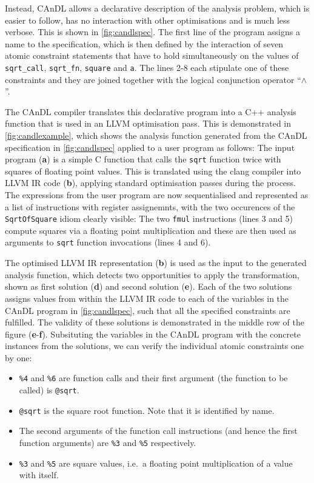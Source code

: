     Instead, CAnDL allows a declarative description of the analysis problem,
    which is easier to follow, has no interaction with other optimisations and
    is much less verbose.
    This is shown in \autoref{fig:candlspec}.
    The first line of the program assigns a name to the specification, which is
    then defined by the interaction of seven atomic constraint statements that
    have to hold simultaneously on the values of \texttt{sqrt\_call},
    \texttt{sqrt\_fn}, \texttt{square} and \texttt{a}.
    The lines 2-8 each stipulate one of these constraints and they are joined
    together with the logical conjunction operator ``$\land$''.

    The CAnDL compiler translates this declarative program into a C++ analysis
    function that is used in an LLVM optimisation pass.
    This is demonstrated in \autoref{fig:candlexample}, which shows the analysis
    function generated from the CAnDL specification in \autoref{fig:candlspec}
    applied to a user program as follows:
    The input program ({\bf a}) is a simple C function that calls the
    \texttt{sqrt} function twice with squares of floating point values.
    This is translated using the clang compiler into LLVM IR code ({\bf b}),
    applying standard optimisation passes during the process.
    The expressions from the user program are now sequentialised and represented
    as a list of instructions with register assignemnts, with the two occurences
    of the \texttt{SqrtOfSquare} idiom clearly visible:
    The two \texttt{fmul} instructions (lines 3 and 5) compute squares via a
    floating point multiplication and these are then used as arguments to
    \texttt{sqrt} function invocations (lines 4 and 6).

    The optimised LLVM IR representation ({\bf b}) is used as the input to the
    generated analysis function, which detects two opportunities to apply the
    transformation, shown as first solution ({\bf d}) and second solution
    ({\bf e}).
    Each of the two solutions assigns values from within the LLVM IR code to
    each of the variables in the CAnDL program in \autoref{fig:candlspec}, such
    that all the specified constraints are fulfilled.
    The validity of these solutions is demonstrated in the middle row of the
    figure ({\bf e}-{\bf f}).
    Subsituting the variables in the CAnDL program with the concrete
    instances from the solutions, we can verify the individual atomic
    constraints one by one:
    \begin{itemize}
    \item \texttt{\%4} and \texttt{\%6} are function calls and their first
          argument (the function to be called) is \texttt{@sqrt}.
    \item \texttt{@sqrt} is the square root function.
          Note that it is identified by name.
    \item The second arguments of the function call instructions (and hence the
          first function arguments) are \texttt{\%3} and \texttt{\%5}
          respectively.
    \item \texttt{\%3} and \texttt{\%5} are square values, i.e.\ a floating
          point multiplication of a value with itself.
    \end{itemize}

